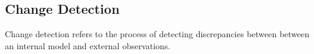 \subsection{Change Detection}

Change detection refers to the process of detecting discrepancies between between an internal model and external observations. 